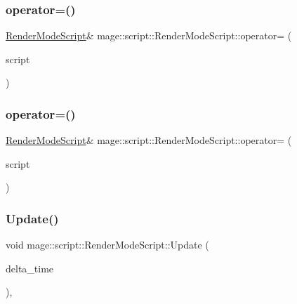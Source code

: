 \subsubsection{\texorpdfstring{operator=()}{operator=()}\hspace{0.1cm}{\footnotesize\ttfamily [1/2]}}
{\footnotesize\ttfamily \hyperlink{classmage_1_1script_1_1_render_mode_script}{Render\+Mode\+Script}\& mage\+::script\+::\+Render\+Mode\+Script\+::operator= (\begin{DoxyParamCaption}\item[{const \hyperlink{classmage_1_1script_1_1_render_mode_script}{Render\+Mode\+Script} \&}]{script }\end{DoxyParamCaption})\hspace{0.3cm}{\ttfamily [delete]}}

\hypertarget{classmage_1_1script_1_1_render_mode_script_a75affa0757f3ad8603d6437e48732ab4}{}\label{classmage_1_1script_1_1_render_mode_script_a75affa0757f3ad8603d6437e48732ab4} 
\subsubsection{\texorpdfstring{operator=()}{operator=()}\hspace{0.1cm}{\footnotesize\ttfamily [2/2]}}
{\footnotesize\ttfamily \hyperlink{classmage_1_1script_1_1_render_mode_script}{Render\+Mode\+Script}\& mage\+::script\+::\+Render\+Mode\+Script\+::operator= (\begin{DoxyParamCaption}\item[{\hyperlink{classmage_1_1script_1_1_render_mode_script}{Render\+Mode\+Script} \&\&}]{script }\end{DoxyParamCaption})\hspace{0.3cm}{\ttfamily [delete]}}

\hypertarget{classmage_1_1script_1_1_render_mode_script_afe0bfc54c414c2697dfd2babaccf3b51}{}\label{classmage_1_1script_1_1_render_mode_script_afe0bfc54c414c2697dfd2babaccf3b51} 
\subsubsection{\texorpdfstring{Update()}{Update()}}
{\footnotesize\ttfamily void mage\+::script\+::\+Render\+Mode\+Script\+::\+Update (\begin{DoxyParamCaption}\item[{\mbox{[}\mbox{[}maybe\+\_\+unused\mbox{]} \mbox{]} \hyperlink{namespacemage_ad26233bbec640deda836e572c1a23708}{F64}}]{delta\+\_\+time }\end{DoxyParamCaption})\hspace{0.3cm}{\ttfamily [override]}, {\ttfamily [virtual]}}


